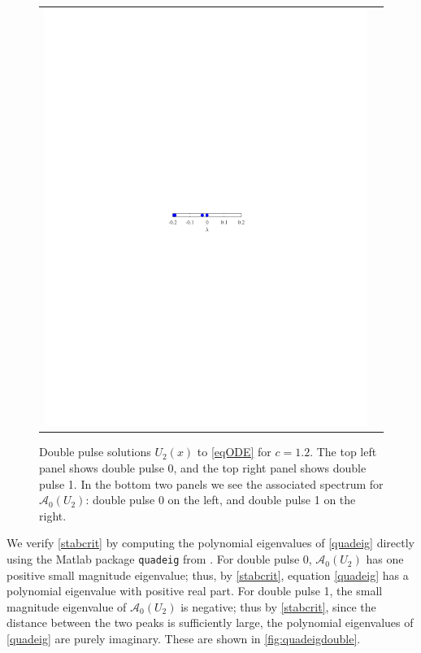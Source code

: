\documentclass[review,onefignum,onetabnum]{siamart171218}
\newcommand{\calA}{\mathcal{A}}
\begin{document}
\begin{figure}[ht]
\begin{tabular}{cc}
\includegraphics{specA0d2}
\end{tabular}
\caption{Double pulse solutions $U_2(x)$ to \cref{eqODE} for $c = 1.2$. The top left panel shows double pulse 0, and the top right panel shows double pulse 1. In the bottom two panels we see the associated spectrum for $\calA_0(U_2)$: double pulse 0 on the left, and double pulse 1 on the right.}
\label{fig:double}
\end{figure}


We verify \cref{stabcrit} by computing the polynomial eigenvalues of \cref{quadeig} directly using the Matlab package \texttt{quadeig} from \cite{Hammarling2013}. For double pulse 0, $\calA_0(U_2)$ has one positive small magnitude eigenvalue; thus, by \cref{stabcrit}, equation \cref{quadeig} has a polynomial eigenvalue with positive real part. For double pulse 1, the small magnitude eigenvalue of $\calA_0(U_2)$ is negative; thus by \cref{stabcrit}, since the distance between the two peaks is sufficiently large, the polynomial eigenvalues of \cref{quadeig} are purely imaginary. These are shown in \cref{fig:quadeigdouble}.
\end{document}
